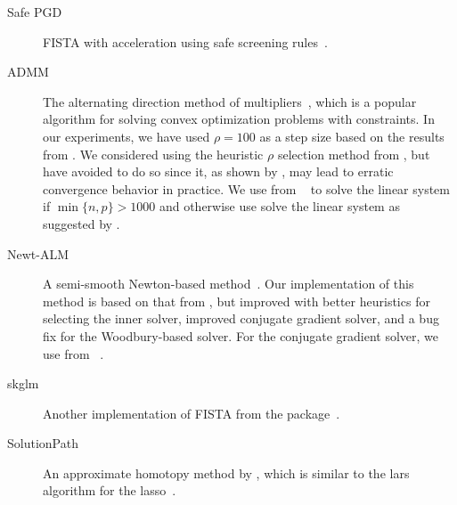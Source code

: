 \documentclass[article]{jss}
\begin{document}
\begin{appendix}
\begin{description}
    \item[Safe PGD] FISTA with acceleration using safe screening
          rules~\citep{elvira2023}.

    \item[ADMM] The alternating direction method of
          multipliers~\citep{glowinski1975,boyd2010}, which is a popular algorithm
          for solving convex optimization problems with constraints. In our experiments,
          we have used \(\rho = 100\) as a step size based on the
          results from \citet{larsson2023}.
          We considered using the heuristic \(\rho\) selection method from
          \citet{boyd2010}, but have avoided to do so since it, as shown by \citet{larsson2023},
          may lead to erratic convergence behavior in practice. We use 
          from ~\citep{virtanen2020} to solve the linear system if
          \(\min\{n, p\} > \num{1000}\) and otherwise use solve the linear system
          as suggested by \citet{boyd2010}.

    \item[Newt-ALM] A semi-smooth Newton-based method~\citep{luo2019}. Our
          implementation of this method is based on that from \citet{larsson2023},
          but improved with better heuristics for selecting the inner solver,
          improved conjugate gradient solver, and
          a bug fix for the Woodbury-based solver. For the conjugate gradient solver,
          we use  from ~\citep{virtanen2020}.

    \item[skglm] Another implementation of FISTA from the
           package~\citep{bertrand2022}.

    \item[SolutionPath] An approximate homotopy method by \citet{dupuis2024},
          which is similar to the lars algorithm for the lasso~\citep{efron2004}.
  \end{description}

\end{appendix}
\end{document}
